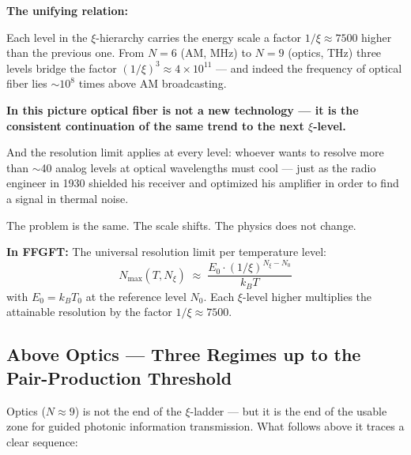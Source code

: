 \begin{foundation}
\medskip
\textbf{The unifying relation:}

Each level in the $\xi$-hierarchy carries the energy scale
a factor $1/\xi \approx 7500$ higher than the previous one.
From $N = 6$ (AM, MHz) to $N = 9$ (optics, THz)
three levels bridge the factor
$(1/\xi)^3 \approx 4 \times 10^{11}$ ---
and indeed the frequency of optical fiber lies
$\sim 10^8$ times above AM broadcasting.

\textbf{In this picture optical fiber is not a new technology ---
it is the consistent continuation of the same trend
to the next $\xi$-level.}

And the resolution limit applies at every level:
whoever wants to resolve more than $\sim$40 analog
levels at optical wavelengths must cool ---
just as the radio engineer in 1930 shielded
his receiver and optimized his amplifier in order
to find a signal in thermal noise.

The problem is the same. The scale shifts.
The physics does not change.

\textbf{In FFGFT:}
The universal resolution limit per temperature level:
\begin{equation}
  \boxed{N_\text{max}(T, N_\xi)
  \;\approx\;
  \frac{E_0 \cdot (1/\xi)^{N_\xi - N_0}}{k_B T}}
\end{equation}
with $E_0 = k_B T_0$ at the reference level $N_0$.
Each $\xi$-level higher multiplies the
attainable resolution by the factor $1/\xi \approx 7500$.
\end{foundation}

\subsection{Above Optics --- Three Regimes up to the Pair-Production Threshold}
\label{sec:above-optics}

Optics ($N \approx 9$) is not the end of the $\xi$-ladder ---
but it is the end of the usable zone for
guided photonic information transmission.
What follows above it traces a clear sequence:

